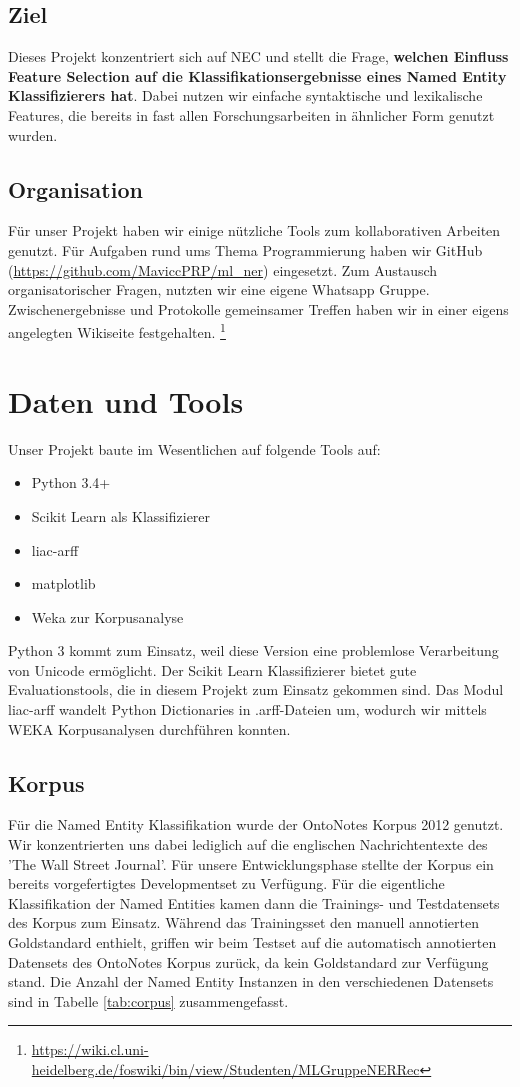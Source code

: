 \documentclass[bibliography=totoc]{scrartcl}
\begin{document}
	\subsection{Ziel}
	Dieses Projekt konzentriert sich auf NEC und stellt die Frage, \textbf{welchen Einfluss Feature Selection auf die
	Klassifikationsergebnisse eines Named Entity Klassifizierers hat}.
	Dabei nutzen wir einfache syntaktische und lexikalische Features, die bereits in fast allen Forschungsarbeiten in ähnlicher Form genutzt wurden. \cite{Toral2006}\cite{Kazama2007}\cite{Ratinov2009}
	\subsection{Organisation}
	Für unser Projekt haben wir einige nützliche Tools zum kollaborativen Arbeiten genutzt. Für Aufgaben rund ums Thema Programmierung haben wir GitHub (\url{https://github.com/MaviccPRP/ml_ner}) eingesetzt. Zum Austausch organisatorischer Fragen, nutzten wir eine eigene Whatsapp Gruppe. Zwischenergebnisse und Protokolle gemeinsamer Treffen haben wir in einer eigens angelegten Wikiseite festgehalten. \footnote{\url{https://wiki.cl.uni-heidelberg.de/foswiki/bin/view/Studenten/MLGruppeNERRec}}
\section{Daten und Tools}
	Unser Projekt baute im Wesentlichen  auf folgende Tools auf:
				\begin{itemize}
					\item Python 3.4+
					\item Scikit Learn als Klassifizierer
					\item liac-arff
					\item matplotlib
					\item Weka zur Korpusanalyse
				\end{itemize}
		Python 3 kommt zum Einsatz, weil diese Version eine problemlose Verarbeitung von Unicode ermöglicht. Der Scikit Learn Klassifizierer bietet gute Evaluationstools, die in diesem Projekt zum Einsatz gekommen sind. Das Modul liac-arff wandelt Python Dictionaries in .arff-Dateien um, wodurch wir mittels WEKA Korpusanalysen durchführen konnten.
	\subsection{Korpus}
	Für die Named Entity Klassifikation wurde der OntoNotes Korpus 2012 genutzt.\cite{Weischedel2013}
	Wir konzentrierten uns dabei lediglich auf die englischen Nachrichtentexte des ’The Wall Street Journal’. Für unsere
	Entwicklungsphase stellte der Korpus ein bereits vorgefertigtes Developmentset zu Verfügung. Für die eigentliche Klassifikation der Named Entities kamen dann die Trainings- und Testdatensets des Korpus zum Einsatz. Während das Trainingsset den manuell annotierten Goldstandard enthielt, griffen wir beim Testset auf die automatisch annotierten Datensets des OntoNotes Korpus zurück, da kein Goldstandard zur Verfügung stand. Die Anzahl der Named Entity Instanzen in den verschiedenen Datensets sind in Tabelle \ref{tab:corpus} zusammengefasst.
\end{document}
